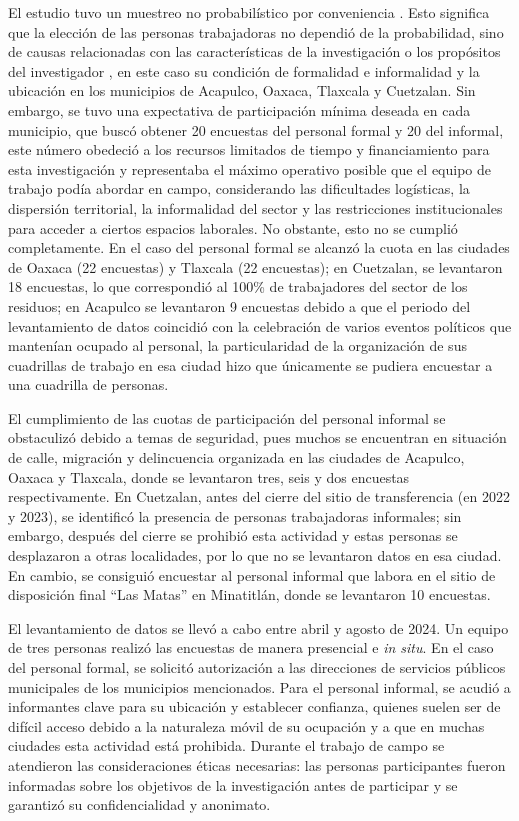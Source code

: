 \documentclass[
  spanish,
  11pt,
  a4paper,
]{scrbook}
\begin{document}
El estudio tuvo un muestreo no probabilístico por conveniencia
\autocite{Hernandez2021}. Esto significa que la elección de las personas
trabajadoras no dependió de la probabilidad, sino de causas relacionadas
con las características de la investigación o los propósitos del
investigador \autocite{Hernandez2014}, en este caso su condición de
formalidad e informalidad y la ubicación en los municipios de Acapulco,
Oaxaca, Tlaxcala y Cuetzalan. Sin embargo, se tuvo una expectativa de
participación mínima deseada en cada municipio, que buscó obtener 20
encuestas del personal formal y 20 del informal, este número obedeció a
los recursos limitados de tiempo y financiamiento para esta
investigación y representaba el máximo operativo posible que el equipo
de trabajo podía abordar en campo, considerando las dificultades
logísticas, la dispersión territorial, la informalidad del sector y las
restricciones institucionales para acceder a ciertos espacios laborales.
No obstante, esto no se cumplió completamente. En el caso del personal
formal se alcanzó la cuota en las ciudades de Oaxaca (22 encuestas) y
Tlaxcala (22 encuestas); en Cuetzalan, se levantaron 18 encuestas, lo
que correspondió al 100\% de trabajadores del sector de los residuos; en
Acapulco se levantaron 9 encuestas debido a que el periodo del
levantamiento de datos coincidió con la celebración de varios eventos
políticos que mantenían ocupado al personal, la particularidad de la
organización de sus cuadrillas de trabajo en esa ciudad hizo que
únicamente se pudiera encuestar a una cuadrilla de personas.

El cumplimiento de las cuotas de participación del personal informal se
obstaculizó debido a temas de seguridad, pues muchos se encuentran en
situación de calle, migración y delincuencia organizada en las ciudades
de Acapulco, Oaxaca y Tlaxcala, donde se levantaron tres, seis y dos
encuestas respectivamente. En Cuetzalan, antes del cierre del sitio de
transferencia (en 2022 y 2023), se identificó la presencia de personas
trabajadoras informales; sin embargo, después del cierre se prohibió
esta actividad y estas personas se desplazaron a otras localidades, por
lo que no se levantaron datos en esa ciudad. En cambio, se consiguió
encuestar al personal informal que labora en el sitio de disposición
final ``Las Matas'' en Minatitlán, donde se levantaron 10 encuestas.

El levantamiento de datos se llevó a cabo entre abril y agosto de 2024.
Un equipo de tres personas realizó las encuestas de manera presencial e
\emph{in situ}. En el caso del personal formal, se solicitó autorización
a las direcciones de servicios públicos municipales de los municipios
mencionados. Para el personal informal, se acudió a informantes clave
para su ubicación y establecer confianza, quienes suelen ser de difícil
acceso debido a la naturaleza móvil de su ocupación y a que en muchas
ciudades esta actividad está prohibida. Durante el trabajo de campo se
atendieron las consideraciones éticas necesarias: las personas
participantes fueron informadas sobre los objetivos de la investigación
antes de participar y se garantizó su confidencialidad y anonimato.
\end{document}
